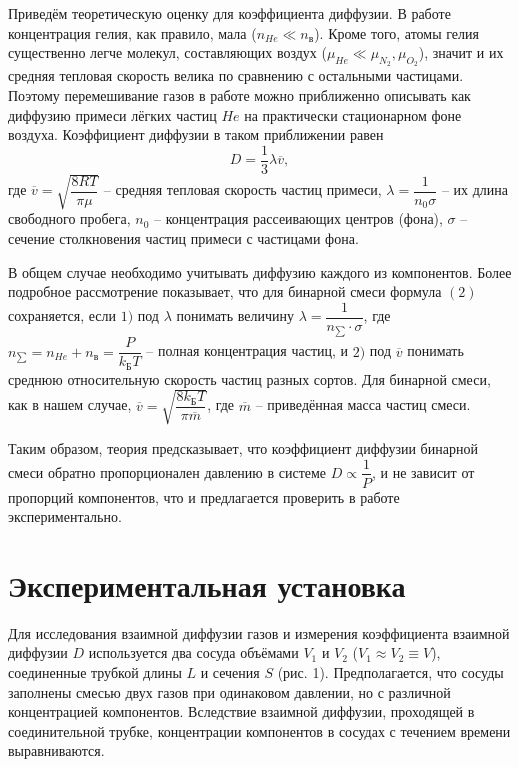 \documentclass[a4paper,11.5pt]{article} %
\begin{document}
Приведём теоретическую оценку для коэффициента диффузии. В работе концентрация гелия, как правило, мала ($n_{He} \ll n_{\text{в}}$). Кроме того, атомы гелия существенно легче молекул, составляющих воздух ($\mu_{He} \ll \mu_{N_2}, \mu_{O_2}$), значит и их средняя тепловая скорость велика по сравнению с остальными частицами. Поэтому перемешивание газов в работе можно приближенно описывать как диффузию примеси лёгких частиц $He$ на практически стационарном фоне воздуха. Коэффициент диффузии в таком приближении равен 
\begin{equation}
	D = \dfrac{1}{3} \lambda \overline{v},
\end{equation}
где $\overline{v} = \sqrt{\dfrac{8RT}{\pi \mu}}$ -- средняя тепловая скорость частиц примеси,
$\lambda = \dfrac{1}{n_0 \sigma}$ -- их длина свободного пробега, $n_0$ -- концентрация рассеивающих центров (фона), $\sigma$ -- сечение столкновения частиц примеси с частицами фона.

В общем случае необходимо учитывать диффузию каждого из компонентов. Более подробное рассмотрение показывает, что для бинарной смеси формула $(2)$ сохраняется, если $1)$ под $\lambda$ понимать величину $\lambda = \dfrac{1}{n_{\sum} \cdot \sigma}$, где $n_{\sum} = n_{He} + n_{\text{в}} = \dfrac{P}{k_{\text{Б}} T}$ -- полная концентрация частиц, и $2)$ под $\overline{v}$ понимать среднюю относительную скорость частиц разных сортов. Для бинарной смеси, как в нашем случае, $\overline{v} = \sqrt{\dfrac{8 k_{\text{Б}} T}{\pi \overline{m}}}$, где $\overline{m}$ -- приведённая масса частиц смеси.

Таким образом, теория предсказывает, что коэффициент диффузии бинарной смеси обратно пропорционален давлению в системе $D \propto \dfrac{1}{P}$, и не зависит от пропорций компонентов, что и предлагается проверить в работе экспериментально.

\section{Экспериментальная установка}

Для исследования взаимной диффузии газов и измерения коэффициента взаимной диффузии $D$ используется два сосуда объёмами $V_1$ и $V_2$ ($V_1 \approx V_2 \equiv V$), соединенные трубкой длины $L$ и сечения $S$ (рис. 1). Предполагается, что сосуды заполнены смесью двух газов при одинаковом давлении, но с различной концентрацией компонентов. Вследствие взаимной диффузии, проходящей в соединительной трубке, концентрации компонентов в сосудах с течением времени выравниваются.
\end{document}
